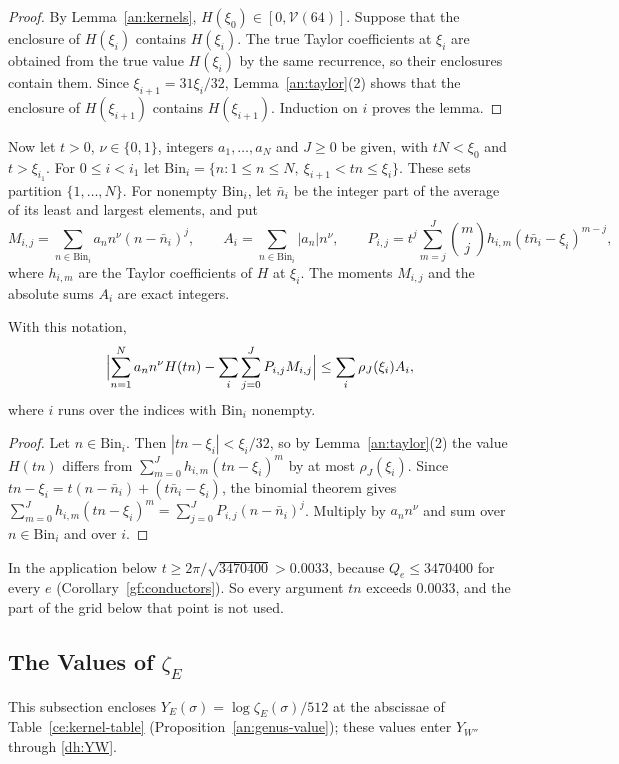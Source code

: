 \begin{proof}
By Lemma~\ref{an:kernels}, $H(\xi_0)\in[0,\mathcal V(64)]$. Suppose that
the enclosure of $H(\xi_i)$ contains $H(\xi_i)$. The true Taylor
coefficients at $\xi_i$ are obtained from the true value $H(\xi_i)$ by the
same recurrence, so their enclosures contain them. Since
$\xi_{i+1}=31\xi_i/32$, Lemma~\ref{an:taylor}(2) shows that the enclosure
of $H(\xi_{i+1})$ contains $H(\xi_{i+1})$. Induction on $i$ proves the
lemma.
\end{proof}

Now let $t>0$, $\nu\in\{0,1\}$, integers $a_1,\ldots,a_N$ and $J\ge0$ be
given, with $tN<\xi_0$ and $t>\xi_{i_1}$. For $0\le i<i_1$ let
$\mathrm{Bin}_i=\{n:1\le n\le N,\ \xi_{i+1}<tn\le\xi_i\}$. These sets
partition $\{1,\ldots,N\}$. For nonempty $\mathrm{Bin}_i$, let $\bar n_i$ be
the integer part of the average of its least and largest elements, and put
\[
 M_{i,j}=\sum_{n\in\mathrm{Bin}_i}a_nn^\nu(n-\bar n_i)^j,\qquad
 A_i=\sum_{n\in\mathrm{Bin}_i}|a_n|n^\nu,\qquad
 P_{i,j}=t^j\sum_{m=j}^J\binom mjh_{i,m}(t\bar n_i-\xi_i)^{m-j},
\]
where $h_{i,m}$ are the Taylor coefficients of $H$ at $\xi_i$. The moments
$M_{i,j}$ and the absolute sums $A_i$ are exact integers.

\begin{lemma}\label{an:binning}
With this notation,
\begin{equation}\label{an:bin-sum}
 \Bigl|\sum_{n=1}^Na_nn^\nu H(tn)-\sum_i\sum_{j=0}^JP_{i,j}M_{i,j}\Bigr|
 \le\sum_i\rho_J(\xi_i)A_i,
\end{equation}
where $i$ runs over the indices with $\mathrm{Bin}_i$ nonempty.
\end{lemma}

\begin{proof}
Let $n\in\mathrm{Bin}_i$. Then $|tn-\xi_i|<\xi_i/32$, so by
Lemma~\ref{an:taylor}(2) the value $H(tn)$ differs from
$\sum_{m=0}^Jh_{i,m}(tn-\xi_i)^m$ by at most $\rho_J(\xi_i)$. Since
$tn-\xi_i=t(n-\bar n_i)+(t\bar n_i-\xi_i)$, the binomial theorem gives
$\sum_{m=0}^Jh_{i,m}(tn-\xi_i)^m=\sum_{j=0}^JP_{i,j}(n-\bar n_i)^j$.
Multiply by $a_nn^\nu$ and sum over $n\in\mathrm{Bin}_i$ and over $i$.
\end{proof}

In the application below $t\ge2\pi/\sqrt{3470400}>0.0033$, because
$Q_e\le3470400$ for every $e$ (Corollary~\ref{gf:conductors}). So every argument
$tn$ exceeds $0.0033$, and the part of the grid below that point is not
used.

\subsection{The Values of $\zeta_E$}
\label{an:value-section}
This subsection encloses $Y_E(\sigma)=\log\zeta_E(\sigma)/512$ at the
abscissae of Table~\ref{ce:kernel-table} (Proposition~\ref{an:genus-value});
these values enter $Y_{W''}$ through \eqref{dh:YW}.

